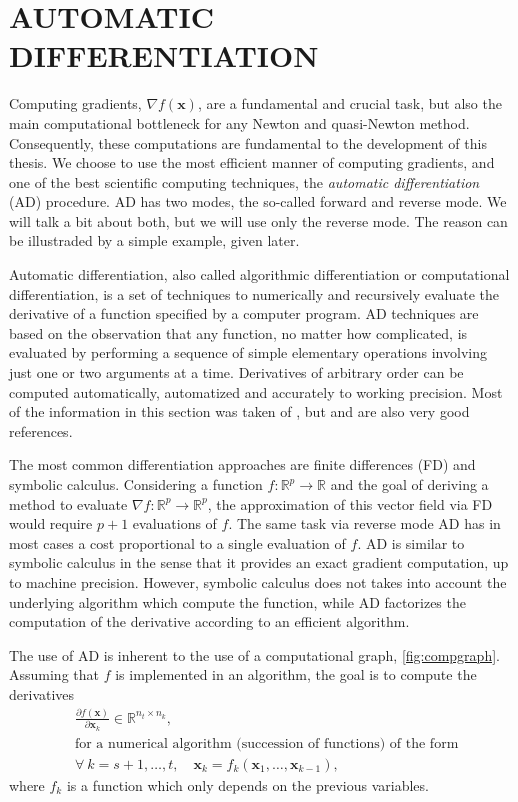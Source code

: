 \section{AUTOMATIC DIFFERENTIATION}
\label{cap:ad}

Computing gradients, \(\nabla f(\mathbf{x})\), are a fundamental and
crucial task, but also the main computational bottleneck for any Newton
and quasi-Newton method. Consequently, these computations are
fundamental to the development of this thesis. We choose to use the most
efficient manner of computing gradients, and one of the best scientific
computing techniques, the \textit{automatic differentiation} (AD)
procedure. AD has two modes, the so-called forward and reverse mode. We
will talk a bit about both, but we will use only the reverse mode. The
reason can be illustraded by a simple example, given later.

Automatic differentiation, also called algorithmic differentiation or
computational differentiation, is a set of techniques to numerically and
recursively evaluate the derivative of a function specified by a
computer program. AD techniques are based on the observation that any
function, no matter how complicated, is evaluated by performing a
sequence of simple elementary operations involving just one or two
arguments at a time. Derivatives of arbitrary order can be computed
automatically, automatized and accurately to working precision. Most of
the information in this section was taken of , but
 and 
are also very good references.

The most common differentiation approaches are finite differences (FD)
and symbolic calculus. Considering a function \(f: \mathbb{R}^{p}
\rightarrow \mathbb{R}\) and the goal of deriving a method to evaluate
\(\nabla f: \mathbb{R}^{p} \rightarrow \mathbb{R}^{p}\), the
approximation of this vector field via FD would require \(p + 1\)
evaluations of \(f\). The same task via reverse mode AD has in most
cases a cost proportional to a single evaluation of \(f\). AD is similar
to symbolic calculus in the sense that it provides an exact gradient
computation, up to machine precision. However, symbolic calculus does
not takes into account the underlying algorithm which compute the
function, while AD factorizes the computation of the derivative
according to an efficient algorithm.

The use of AD is inherent to the use of a computational graph,
\autoref{fig:compgraph}. Assuming that \(f\) is implemented in an
algorithm, the goal is to compute the derivatives
\begin{align*}
  &\frac{\partial f(\mathbf{x})}{\partial\mathbf{x}_{k}} \in
  \mathbb{R}^{n_{t} \times n_{k}},\\
  &\text{for a numerical algorithm
         (succession of functions) of the form}\\
  &\forall~k = s + 1, \dots, t, \quad
    \mathbf{x}_{k} = f_{k}(\mathbf{x}_{1}, \dots, \mathbf{x}_{k-1}),
\end{align*}
where \(f_{k}\) is a function which only depends on the previous
variables.

